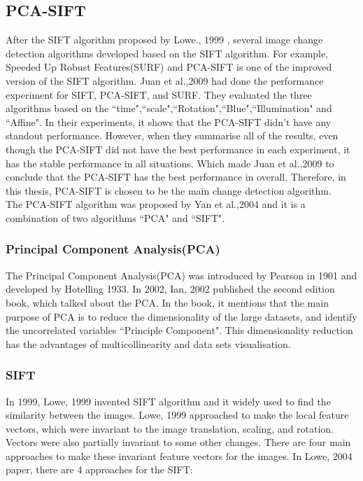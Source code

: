 \documentclass[runningheads,a4paper]{llncs}
\newcommand{\yongli}{\todo[author=YL,color=green,inline]}
\begin{document}
\subsection{PCA-SIFT} 
\yongli{This belongs to related work. }
After the SIFT algorithm proposed by Lowe., 1999 \cite{790410}, several image change detection algorithms developed based on the SIFT algorithm. For example,  Speeded Up Robust Features(SURF)\cite{bay2006surf} and PCA-SIFT\cite{1315206} is one of the improved version of the SIFT algorithm. Juan et al.,2009\cite{juan2009comparison} had done the performance experiment for SIFT, PCA-SIFT, and SURF. They evaluated the three algorithms based on the ``time",``scale",``Rotation",``Blue",``Illumination" and ``Affine". In their experiments, it shows that the PCA-SIFT didn't have any standout performance. However, when they summarise all of the results, even though the PCA-SIFT did not have the best performance in each experiment, it has the stable performance in all situations. Which made Juan et al.,2009\cite{juan2009comparison} to conclude that the PCA-SIFT has the best performance in overall. Therefore, in this thesis, PCA-SIFT is chosen to be the main change detection algorithm.\\
The PCA-SIFT algorithm was proposed by Yan et al.,2004\cite{1315206} and it is a combination of two algorithms ``PCA" and ``SIFT".


\subsubsection{Principal  Component  Analysis(PCA)}
The Principal  Component  Analysis(PCA) was introduced by Pearson in 1901 and developed by Hotelling 1933. In 2002, Ian, 2002 \cite{jolliffe2002principal} published the second edition book, which talked about the PCA. In the book, it mentions that the main purpose of PCA is to reduce the dimensionality of the large datasets, and identify the uncorrelated variables ``Principle Component". This dimensionality reduction has the advantages of multicollinearity and data sets visualisation. \\


\subsubsection{SIFT}
In 1999, Lowe, 1999 \cite{790410} invented SIFT algorithm and it widely used to find the similarity between the images. Lowe, 1999 \cite{790410} approached to make the local feature vectors, which were invariant to the image translation, scaling, and rotation. Vectors were also partially invariant to some other changes. There are four main approaches to make these invariant feature vectors for the images. In Lowe, 2004 \cite{Lowe2004} paper, there are 4 approaches for the SIFT:
\end{document}

